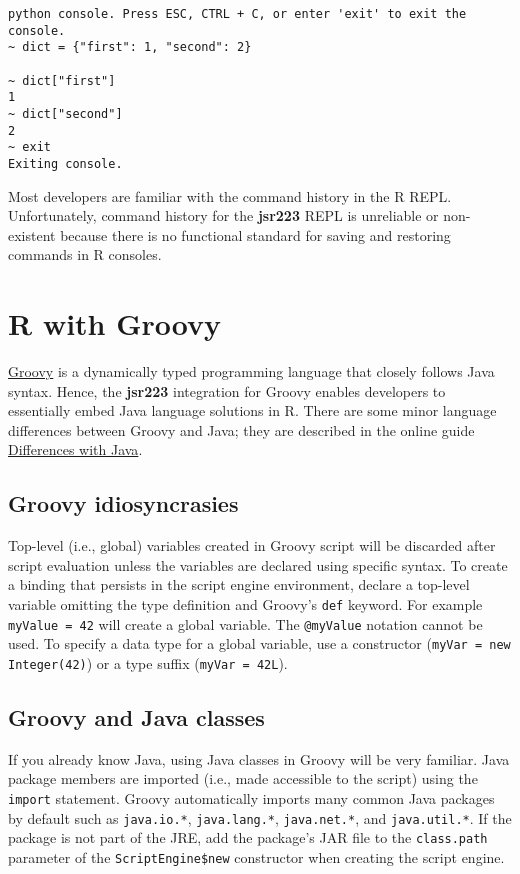 \documentclass[
article,
11pt, %
a4paper, %
oneside, %
headinclude,footinclude, %
]{scrartcl}
\theoremstyle{definition} %
\theoremstyle{plain} %
\theoremstyle{remark} %
\newcommand{\pkg}[1]{\textbf{#1}}
\newcommand{\code}[1]{\texttt{#1}}
\begin{document}
\begin{verbatim}
python console. Press ESC, CTRL + C, or enter 'exit' to exit the console.
~ dict = {"first": 1, "second": 2}

~ dict["first"]
1
~ dict["second"]
2
~ exit
Exiting console.
\end{verbatim}

Most developers are familiar with the command history in the R REPL.  Unfortunately, command history for the \pkg{jsr223} REPL is unreliable or non-existent because there is no functional standard for saving and restoring commands in R consoles.

\hypertarget{r-with-groovy}{}
\section{R with Groovy}

\href{http://www.groovy-lang.org/}{Groovy} is a dynamically typed programming language that closely follows Java syntax. Hence, the \pkg{jsr223} integration for Groovy enables developers to essentially embed Java language solutions in R. There are some minor language differences between Groovy and Java; they are described in the online guide  \href{http://groovy-lang.org/differences.html}{Differences with Java}. %

\subsection{Groovy idiosyncrasies}

Top-level (i.e., global) variables created in Groovy script will be discarded after script evaluation unless the variables are declared using specific syntax. To create a binding that persists in the script engine environment, declare a top-level variable omitting the type definition and Groovy's \code{def} keyword. For example \code{myValue = 42} will create a global variable. The \code{@myValue} notation cannot be used. To specify a data type for a global variable, use a constructor (\code{myVar = new Integer(42)}) or a type suffix (\code{myVar = 42L}).

\subsection{Groovy and Java classes}

If you already know Java, using Java classes in Groovy will be very familiar. Java package members are imported (i.e., made accessible to the script) using the \code{import} statement. Groovy automatically imports many common Java packages by default such as \code{java.io.*}, \code{java.lang.*}, \code{java.net.*}, and \code{java.util.*}. If the package is not part of the JRE, add the package's JAR file to the \code{class.path} parameter of the \code{ScriptEngine\$new} constructor when creating the script engine. 
\end{document}
